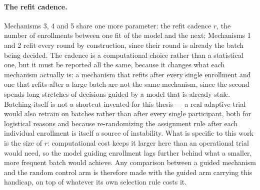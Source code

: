 \vspace{10pt}

\paragraph{The refit cadence.}
Mechanisms 3, 4 and 5 share one more parameter: the refit cadence $r$, the number of
enrollments between one fit of the model and the next; Mechanisms 1 and 2 refit every
round by construction, since their round is already the batch being decided. The cadence
is a computational choice rather than a statistical one, but it must be reported all the
same, because it changes what each mechanism actually is: a mechanism that refits after every single
enrollment and one that refits after a large batch are not the same mechanism, since the
second spends long stretches of decisions guided by a model that is already stale.
Batching itself is not a shortcut invented for this thesis --- a real adaptive trial
would also retrain on batches rather than after every single participant, both for
logistical reasons and because re-randomizing the assignment rule after each individual
enrollment is itself a source of instability. What is specific to this work is the size
of $r$: computational cost keeps it larger here than an operational trial would need, so
the model guiding enrollment lags further behind what a smaller, more frequent batch
would achieve. Any comparison between a guided mechanism and the random control arm is
therefore made with the guided arm carrying this handicap, on top of whatever its own
selection rule costs it.

\vspace{10pt}

